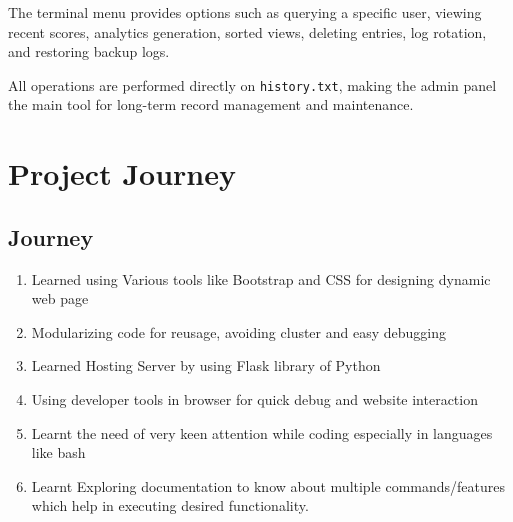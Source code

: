 \documentclass[12pt]{article}
\begin{document}
The terminal menu provides options such as querying a specific user, viewing recent scores, analytics generation, sorted views, deleting entries, log rotation, and restoring backup logs.

All operations are performed directly on \texttt{history.txt}, making the admin panel the main tool for long-term record management and maintenance.

\section{Project Journey}
    \subsection{Journey}
        \begin{enumerate}
            \item Learned using Various tools like Bootstrap and CSS for designing dynamic web page
            \item Modularizing code for reusage, avoiding cluster and easy debugging
            \item Learned Hosting Server by using Flask library of Python
            \item Using developer tools in browser for quick debug and website interaction
            \item Learnt the need of very keen attention while coding especially in languages like bash
            \item Learnt Exploring documentation to know about multiple commands/features which help in executing desired functionality.
            
        \end{enumerate}
\end{document}
